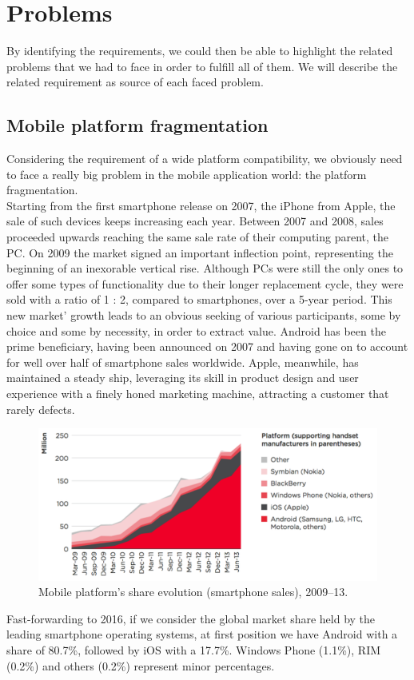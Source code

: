 
\chapter{Problems}
\label{Chapter6} 
By identifying  the requirements, we could then be able to highlight the related problems that we had to face in order to fulfill all of them. We will describe the related requirement as source of each faced problem.

\section{Mobile platform fragmentation}
Considering the requirement of a wide platform compatibility, we obviously need to face a really big problem in the mobile application world: the platform fragmentation.\\
Starting from the first smartphone release on 2007, the iPhone from Apple,  the sale of such devices keeps increasing each year. Between 2007 and 2008, sales proceeded upwards reaching the same sale rate of their computing parent, the PC. On 2009  the market signed an important inflection point, representing the beginning of an inexorable vertical rise. Although PCs were still the only ones to offer some types of functionality due to their longer replacement cycle, they were sold with a ratio of 1 : 2, compared to smartphones, over a 5-year period. This new market’ growth leads to an obvious seeking of various participants, some by choice and some by necessity, in order to extract value. Android has been the prime beneficiary, having been announced on 2007 and having gone on to account for well over half of smartphone sales worldwide. Apple, meanwhile, has maintained a steady ship, leveraging its skill in product design and user experience with a finely honed marketing machine, attracting a customer that rarely defects.\cite{ref5}
\begin{figure}[ht!]
	\centering
	\includegraphics[width=120mm]{figures/ch6/1.png}
	\caption{Mobile platform's share evolution (smartphone sales), 2009–13.}
	\label{fig6.1}
\end{figure}
Fast-forwarding to 2016, if we consider the global market share held by the leading smartphone operating systems, at first position we have Android with a share of  80.7\%, followed by iOS with a 17.7\%. Windows Phone (1.1\%), RIM (0.2\%) and others (0.2\%) represent minor percentages.\cite{ref6}

